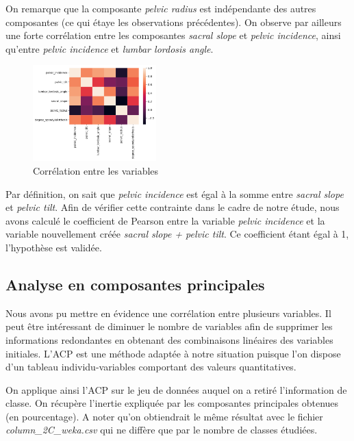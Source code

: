 \documentclass[twocolumn,10pt]{article}
\begin{document}
On remarque que la composante \textit{pelvic radius} est indépendante des autres composantes (ce qui étaye les observations précédentes). On observe par ailleurs une forte corrélation entre les composantes \textit{sacral slope} et \textit{pelvic incidence}, ainsi qu'entre \textit{pelvic incidence} et \textit{lumbar lordosis angle}.

\begin{figure}[htbp]
    \begin{center}
        \includegraphics[width=0.425\textwidth]{figures/heat_map_variables.png}
        \caption{\label{fig:heat_map_variables}Corrélation entre les variables}
    \end{center}
\end{figure}

Par définition, on sait que \textit{pelvic incidence} est égal à la somme entre \textit{sacral slope} et \textit{pelvic tilt}. Afin de vérifier cette contrainte dans le cadre de notre étude, nous avons calculé le coefficient de Pearson entre la variable \textit{pelvic incidence} et la variable nouvellement créée \textit{sacral slope + pelvic tilt}. Ce coefficient étant égal à 1, l'hypothèse est validée.

\subsection{Analyse en composantes principales}

Nous avons pu mettre en évidence une corrélation entre plusieurs variables. Il peut être intéressant de diminuer le nombre de variables afin de supprimer les informations redondantes en obtenant des combinaisons linéaires des variables initiales. L'ACP est une méthode adaptée à notre situation puisque l'on dispose d'un tableau individu-variables comportant des valeurs quantitatives.

On applique ainsi l'ACP sur le jeu de données auquel on a retiré l'information de classe. On récupère l'inertie expliquée par les composantes principales obtenues (en pourcentage). A noter qu'on obtiendrait le même résultat avec le fichier \textit{column\_2C\_weka.csv} qui ne diffère que par le nombre de classes étudiées.
\end{document}
